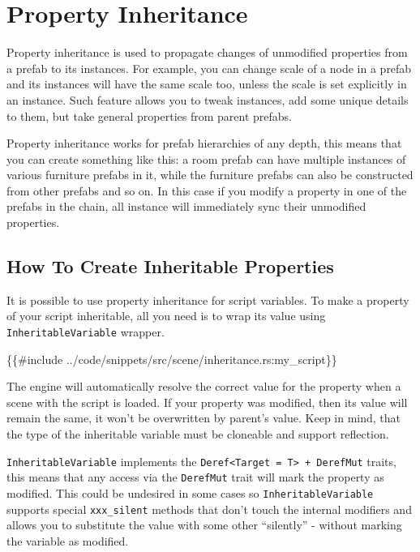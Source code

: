 \documentclass[
]{book}
\newenvironment{Shaded}{\begin{snugshade}}{\end{snugshade}}
\newcommand{\NormalTok}[1]{#1}
\theoremstyle{definition}
\theoremstyle{definition}
\theoremstyle{definition}
\theoremstyle{definition}
\theoremstyle{remark}
\begin{document}
\section{Property Inheritance}\label{property-inheritance-1}

Property inheritance is used to propagate changes of unmodified properties from a prefab to its instances. For example, you can change scale of a node in a prefab and its instances will have the same scale too, unless the scale is set explicitly in an instance. Such feature allows you to tweak instances, add some unique details to them, but take general properties from parent prefabs.

Property inheritance works for prefab hierarchies of any depth, this means that you can create something like this: a room prefab can have multiple instances of various furniture prefabs in it, while the furniture prefabs can also be constructed from other prefabs and so on. In this case if you modify a property in one of the prefabs in the chain, all instance will immediately sync their unmodified properties.

\subsection{How To Create Inheritable Properties}\label{how-to-create-inheritable-properties}

It is possible to use property inheritance for script variables. To make a property of your script inheritable, all you need is to wrap its value using \texttt{InheritableVariable} wrapper.

\begin{Shaded}
\begin{Highlighting}[]
\NormalTok{\{\{\#include ../code/snippets/src/scene/inheritance.rs:my\_script\}\}}
\end{Highlighting}
\end{Shaded}

The engine will automatically resolve the correct value for the property when a scene with the script is loaded. If your property was modified, then its value will remain the same, it won't be overwritten by parent's value. Keep in mind, that the type of the inheritable variable must be cloneable and support reflection.

\texttt{InheritableVariable} implements the \texttt{Deref\textless{}Target\ =\ T\textgreater{}\ +\ DerefMut} traits, this means that any access via the \texttt{DerefMut} trait will mark the property as modified. This could be undesired in some cases so \texttt{InheritableVariable} supports special \texttt{xxx\_silent} methods that don't touch the internal modifiers and allows you to substitute the value with some other ``silently'' - without marking the variable as modified.
\end{document}
